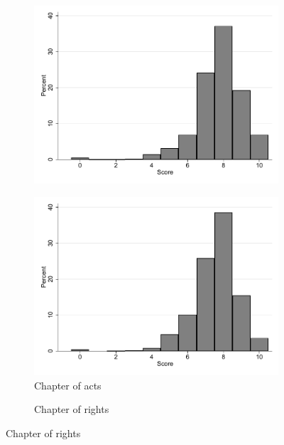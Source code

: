 \documentclass[oneside,11pt]{article}
\begin{document}
\begin{figure}[H]
\begin{center}
\begin{subfigure}{0.49\textwidth}
        \centering
        \includegraphics[width=\textwidth]{Figuras/hist_calif_prestaciones.pdf}
    \end{subfigure}
    \begin{subfigure}{0.49\textwidth}
        \caption{Chapter of acts}
        \centering
        \includegraphics[width=\textwidth]{Figuras/hist_calif_hechos.pdf}
    \end{subfigure}    
 \begin{subfigure}{0.49\textwidth}
        \caption{Chapter of rights}
        \centering

\end{subfigure}
\end{center}
\end{figure}
\end{document}
